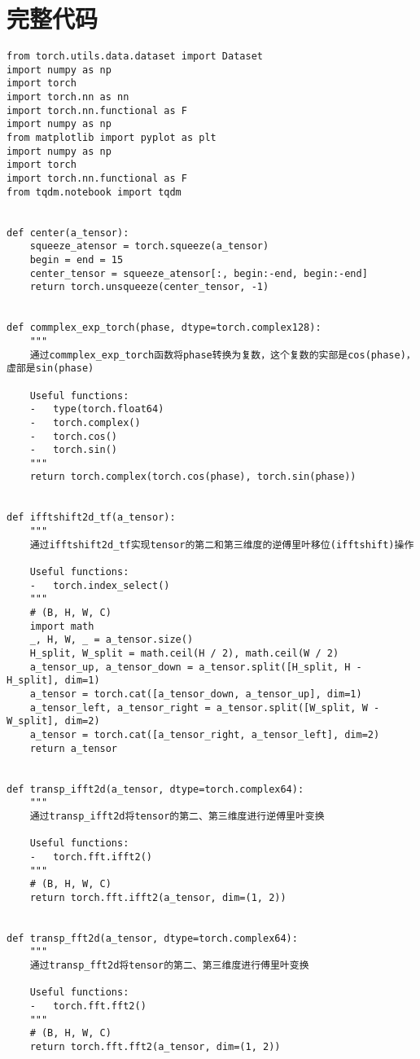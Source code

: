 \appendix

\section{完整代码}

\begin{lstlisting}[style=Python]
from torch.utils.data.dataset import Dataset
import numpy as np
import torch
import torch.nn as nn
import torch.nn.functional as F
import numpy as np
from matplotlib import pyplot as plt
import numpy as np
import torch
import torch.nn.functional as F
from tqdm.notebook import tqdm


def center(a_tensor):
    squeeze_atensor = torch.squeeze(a_tensor)
    begin = end = 15
    center_tensor = squeeze_atensor[:, begin:-end, begin:-end]
    return torch.unsqueeze(center_tensor, -1)


def commplex_exp_torch(phase, dtype=torch.complex128):
    """
    通过commplex_exp_torch函数将phase转换为复数，这个复数的实部是cos(phase)，虚部是sin(phase)
    
    Useful functions:
    -   type(torch.float64)
    -   torch.complex()
    -   torch.cos()
    -   torch.sin()
    """
    return torch.complex(torch.cos(phase), torch.sin(phase))


def ifftshift2d_tf(a_tensor):
    """
    通过ifftshift2d_tf实现tensor的第二和第三维度的逆傅里叶移位(ifftshift)操作

    Useful functions:
    -   torch.index_select()
    """
    # (B, H, W, C)
    import math
    _, H, W, _ = a_tensor.size()
    H_split, W_split = math.ceil(H / 2), math.ceil(W / 2)
    a_tensor_up, a_tensor_down = a_tensor.split([H_split, H - H_split], dim=1)
    a_tensor = torch.cat([a_tensor_down, a_tensor_up], dim=1)
    a_tensor_left, a_tensor_right = a_tensor.split([W_split, W - W_split], dim=2)
    a_tensor = torch.cat([a_tensor_right, a_tensor_left], dim=2)
    return a_tensor


def transp_ifft2d(a_tensor, dtype=torch.complex64):
    """
    通过transp_ifft2d将tensor的第二、第三维度进行逆傅里叶变换

    Useful functions:
    -   torch.fft.ifft2()
    """
    # (B, H, W, C)
    return torch.fft.ifft2(a_tensor, dim=(1, 2))


def transp_fft2d(a_tensor, dtype=torch.complex64):
    """
    通过transp_fft2d将tensor的第二、第三维度进行傅里叶变换

    Useful functions:
    -   torch.fft.fft2()
    """
    # (B, H, W, C)
    return torch.fft.fft2(a_tensor, dim=(1, 2))



\end{lstlisting}
